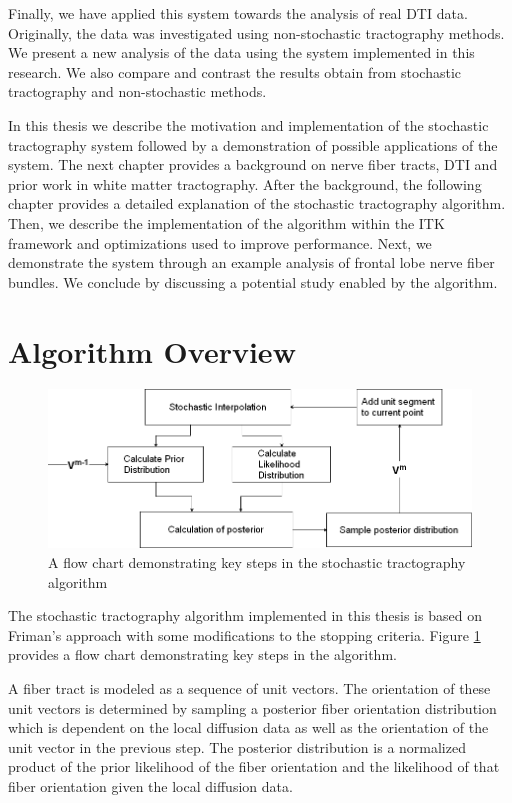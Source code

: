 \documentclass{InsightArticle}
\begin{document}
Finally, we have applied this system towards the analysis of real DTI data.  Originally, the data was investigated using non-stochastic tractography methods.  We present a new analysis of the data using the system implemented in this research.  We also compare and contrast the results obtain from stochastic tractography and non-stochastic methods.

In this thesis we describe the motivation and implementation of the stochastic tractography system followed by a demonstration of possible applications of the system.  The next chapter  provides a background on nerve fiber tracts, DTI and prior work in white matter tractography.  After the background, the following chapter provides a detailed explanation of the stochastic tractography algorithm.  Then, we describe the implementation of the algorithm within the ITK framework and optimizations used to improve performance.  Next, we demonstrate the system through an example analysis of frontal lobe nerve fiber bundles.  We conclude by discussing a potential study enabled by the algorithm.

\section{Algorithm Overview}

\begin{figure}
  \center 
	\includegraphics[width=\linewidth]{stflowsmall}
	\caption{A flow chart demonstrating key steps in the stochastic tractography algorithm}
	 \label{fig:stflow}
\end{figure}
The stochastic tractography algorithm implemented in this thesis is based on Friman's \cite{frimanTMI06} approach with some modifications to the stopping criteria.  Figure \ref{fig:stflow} provides a flow chart demonstrating key steps in the algorithm. 

A fiber tract is modeled as a sequence of unit vectors.  The orientation of these unit vectors is determined by sampling a posterior fiber orientation distribution which is dependent on the local diffusion data as well as the orientation of the unit vector in the previous step.  The posterior distribution is a normalized product of the prior likelihood of the fiber orientation and the likelihood of that fiber orientation given the local diffusion data.
\end{document}
